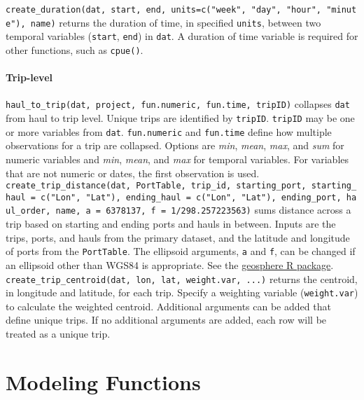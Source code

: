 \documentclass[
]{article}
\begin{document}
\texttt{create\_duration(dat,\ start,\ end,\ units=c("week",\ "day",\ "hour",\ "minute"),\ name)} returns the duration of time, in specified \texttt{units}, between two temporal variables (\texttt{start}, \texttt{end}) in \texttt{dat}. A duration of time variable is required for other functions, such as \texttt{cpue()}.

\hypertarget{trip-level}{%
\paragraph{Trip-level}\label{trip-level}}

\texttt{haul\_to\_trip(dat,\ project,\ fun.numeric,\ fun.time,\ tripID)} collapses \texttt{dat} from haul to trip level. Unique trips are identified by \texttt{tripID}. \texttt{tripID} may be one or more variables from \texttt{dat}. \texttt{fun.numeric} and \texttt{fun.time} define how multiple observations for a trip are collapsed. Options are \emph{min}, \emph{mean}, \emph{max}, and \emph{sum} for numeric variables and \emph{min}, \emph{mean}, and \emph{max} for temporal variables. For variables that are not numeric or dates, the first observation is used.\\
\texttt{create\_trip\_distance(dat,\ PortTable,\ trip\_id,\ starting\_port,\ starting\_haul\ =\ c("Lon",\ "Lat"),\ ending\_haul\ =\ c("Lon",\ "Lat"),\ ending\_port,\ haul\_order,\ name,\ a\ =\ 6378137,\ f\ =\ 1/298.257223563)} sums distance across a trip based on starting and ending ports and hauls in between. Inputs are the trips, ports, and hauls from the primary dataset, and the latitude and longitude of ports from the \texttt{PortTable}. The ellipsoid arguments, \texttt{a} and \texttt{f}, can be changed if an ellipsoid other than WGS84 is appropriate. See the \href{https://cran.r-project.org/web/packages/geosphere/geosphere.pdf}{geosphere R package}.\\
\texttt{create\_trip\_centroid(dat,\ lon,\ lat,\ weight.var,\ ...)} returns the centroid, in longitude and latitude, for each trip. Specify a weighting variable (\texttt{weight.var}) to calculate the weighted centroid. Additional arguments can be added that define unique trips. If no additional arguments are added, each row will be treated as a unique trip.

\hypertarget{modeling-functions}{%
\section{Modeling Functions}\label{modeling-functions}}
\end{document}
